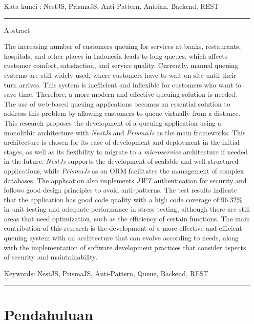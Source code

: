 \bigskip
Kata kunci : NestJS, PrismaJS, Anti-Pattern, Antrian, Backend, REST
\newpage





\newpage

\noindent\rule{\textwidth}{1pt}
Abstract

The increasing number of customers queuing for services at banks, restaurants, hospitals, and other places in Indonesia leads to long queues, which affects customer comfort, satisfaction, and service quality. Currently, manual queuing systems are still widely used, where customers have to wait on-site until their turn arrives. This system is inefficient and inflexible for customers who want to save time. Therefore, a more modern and effective queuing solution is needed. The use of web-based queuing applications becomes an essential solution to address this problem by allowing customers to queue virtually from a distance. This research proposes the development of a queuing application using a monolithic architecture with \textit{NestJs} and \textit{PrismaJs} as the main frameworks. This architecture is chosen for its ease of development and deployment in the initial stages, as well as its flexibility to migrate to a \textit{microservice} architecture if needed in the future. \textit{NestJs} supports the development of scalable and well-structured applications, while \textit{PrismaJs} as an ORM facilitates the management of complex databases. The application also implements \textit{JWT} authentication for security and follows good design principles to avoid anti-patterns.
The test results indicate that the application has good code quality with a high code coverage of 96.32\% in unit testing and adequate performance in stress testing, although there are still areas that need optimization, such as the efficiency of certain functions. The main contribution of this research is the development of a more effective and efficient queuing system with an architecture that can evolve according to needs, along with the implementation of software development practices that consider aspects of security and maintainability.

\bigskip
Keywords: NestJS, PrismaJS, Anti-Pattern, Queue, Backend, REST

\noindent\rule{\textwidth}{1pt}
\newpage



\section{Pendahuluan}

